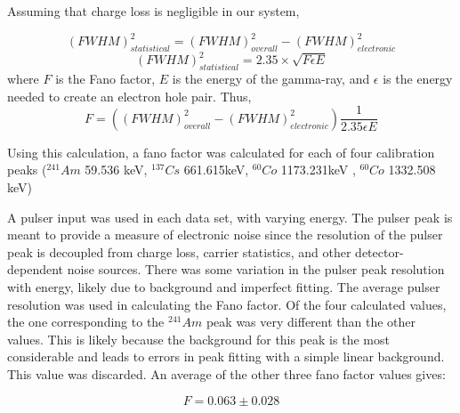 Assuming that charge loss is negligible in our system,

\begin{equation}
(FWHM)^{2}_{statistical} = (FWHM)^{2}_{overall} - (FWHM)^{2}_{electronic}
\end{equation}
\begin{equation}
(FWHM)^{2}_{statistical} = 2.35 \times \sqrt{F \epsilon E}
\end{equation}
where $F$ is the Fano factor, $E$ is the energy of the gamma-ray, and $\epsilon$ is the energy needed to create an electron hole pair. Thus,
\begin{equation}
F = ((FWHM)^{2}_{overall} - (FWHM)^{2}_{electronic}) \frac{1}{2.35 \epsilon E}
\end{equation}

Using this calculation, a fano factor was calculated for each of four calibration peaks (${}^{241}Am$ 59.536 keV, ${}^{137}Cs$ 661.615keV, ${}^{60}Co$ 1173.231keV , ${}^{60}Co$ 1332.508 keV)
  
A pulser input was used in each data set, with varying energy. The pulser peak is meant to provide a measure of electronic noise since the resolution of the pulser peak is decoupled from charge loss, carrier statistics, and other detector-dependent noise sources. There was some variation in the pulser peak resolution with energy, likely due to background and imperfect fitting. The average pulser resolution was used in calculating the Fano factor. Of the four calculated values, the one corresponding to the ${}^{241}Am$ peak was very different than the other values. This is likely because the background for this peak is the most considerable and leads to errors in peak fitting with a simple linear background. This value was discarded. An average of the other three fano factor values gives:

\begin{equation}
F = 0.063 \pm0.028
\end{equation}